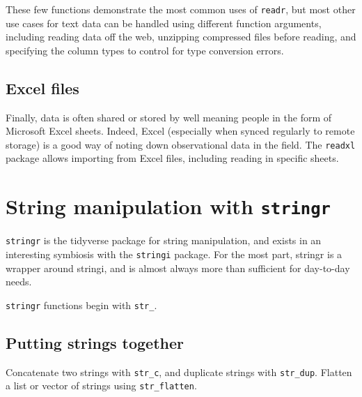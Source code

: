 \documentclass[]{book}
\begin{document}
These few functions demonstrate the most common uses of \texttt{readr}, but most other use cases for text data can be handled using different function arguments, including reading data off the web, unzipping
compressed files before reading, and specifying the column types to control for type conversion errors.

\hypertarget{excel-files}{%
\subsection*{Excel files}\label{excel-files}}

Finally, data is often shared or stored by well meaning people in the form of Microsoft Excel sheets. Indeed, Excel (especially when synced regularly to remote storage) is a good way of noting down observational data in the field. The \texttt{readxl} package allows importing from Excel files, including reading in specific sheets.

\hypertarget{string-manipulation-with-stringr}{%
\section{\texorpdfstring{String manipulation with \texttt{stringr}}{String manipulation with stringr}}\label{string-manipulation-with-stringr}}

\texttt{stringr} is the tidyverse package for string manipulation, and exists in an interesting symbiosis with the \texttt{stringi} package. For the most part, stringr is a wrapper around stringi, and is almost always more than sufficient for day-to-day needs.

\texttt{stringr} functions begin with \texttt{str\_}.

\hypertarget{putting-strings-together}{%
\subsection{Putting strings together}\label{putting-strings-together}}

Concatenate two strings with \texttt{str\_c}, and duplicate strings with \texttt{str\_dup}. Flatten a list or vector of strings using \texttt{str\_flatten}.
\end{document}
